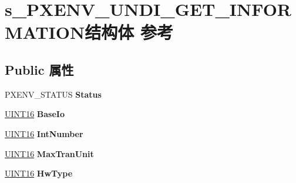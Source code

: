 \hypertarget{structs___p_x_e_n_v___u_n_d_i___g_e_t___i_n_f_o_r_m_a_t_i_o_n}{}\section{s\+\_\+\+P\+X\+E\+N\+V\+\_\+\+U\+N\+D\+I\+\_\+\+G\+E\+T\+\_\+\+I\+N\+F\+O\+R\+M\+A\+T\+I\+O\+N结构体 参考}
\label{structs___p_x_e_n_v___u_n_d_i___g_e_t___i_n_f_o_r_m_a_t_i_o_n}
\subsection*{Public 属性}
\begin{DoxyCompactItemize}
\item 
\mbox{\label{structs___p_x_e_n_v___u_n_d_i___g_e_t___i_n_f_o_r_m_a_t_i_o_n_a6ee28e6d2c3d2532a81664736d3e100b}} 
P\+X\+E\+N\+V\+\_\+\+S\+T\+A\+T\+US {\bfseries Status}
\item 
\mbox{\label{structs___p_x_e_n_v___u_n_d_i___g_e_t___i_n_f_o_r_m_a_t_i_o_n_a634f0fc3df9c36462ec20738ef8a7a65}} 
\hyperlink{_processor_bind_8h_a09f1a1fb2293e33483cc8d44aefb1eb1}{U\+I\+N\+T16} {\bfseries Base\+Io}
\item 
\mbox{\label{structs___p_x_e_n_v___u_n_d_i___g_e_t___i_n_f_o_r_m_a_t_i_o_n_a951c40c09e786b9431ec1eb903e56f27}} 
\hyperlink{_processor_bind_8h_a09f1a1fb2293e33483cc8d44aefb1eb1}{U\+I\+N\+T16} {\bfseries Int\+Number}
\item 
\mbox{\label{structs___p_x_e_n_v___u_n_d_i___g_e_t___i_n_f_o_r_m_a_t_i_o_n_a878ec0e5c8b47ee76c5e62939f441581}} 
\hyperlink{_processor_bind_8h_a09f1a1fb2293e33483cc8d44aefb1eb1}{U\+I\+N\+T16} {\bfseries Max\+Tran\+Unit}
\item 
\mbox{\label{structs___p_x_e_n_v___u_n_d_i___g_e_t___i_n_f_o_r_m_a_t_i_o_n_a81477ac4ef40ad1a03d0ed430cab38fb}} 
\hyperlink{_processor_bind_8h_a09f1a1fb2293e33483cc8d44aefb1eb1}{U\+I\+N\+T16} {\bfseries Hw\+Type}

\end{DoxyCompactItemize}
